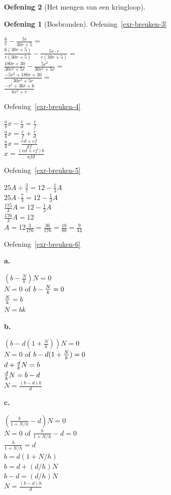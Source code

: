 \documentclass[
  a4paper,
]{scrbook}
\theoremstyle{definition}
\newtheorem{exercise}{Oefening}[chapter]
\theoremstyle{remark}
\begin{document}
\begin{exercise}[Het mengen van een
kringloop]
\begin{exercise}[Bosbranden]
Oefening~\ref{exr-breuken-3}

\(\frac{6}{r} - \frac{5r}{30r+5} =\)\\
\(\frac{6(30r + 5)}{r(30r + 5)} - \frac{5r\cdot r}{r(30r+5)} =\)\\
\(\frac{180r + 30}{30r^2 + 5r} - \frac{5r^2}{30r^2+5r} =\)\\
\(\frac{-5r^2 + 180r + 30}{30r^2 + 5r} =\)\\
\(\frac{-r^2 + 36r + 6}{6r^2 + r}\)

Oefening~\ref{exr-breuken-4}

\(\frac{a}{b}x - \frac{c}{d} = \frac{e}{f}\)\\
\(\frac{a}{b}x=\frac{e}{f}+\frac{c}{d}\)\\
\(\frac{a}{b}x=\frac{ed+cf}{df}\)\\
\(x=\frac{(ed+cf)b}{afd}\)

Oefening~\ref{exr-breuken-5}

\(25A\div\frac{3}{7} = 12 - \frac{1}{3}A\)\\
\(25 A \cdot\frac{7}{3}=12-\frac{1}{3}A\)\\
\(\frac{175}{3}A=12-\frac{1}{3}A\)\\
\(\frac{176}{3}A=12\)\\
\(A=12\frac{3}{176}=\frac{36}{176}=\frac{18}{88}=\frac{9}{44}\)

Oefening~\ref{exr-breuken-6}

\textbf{a.}

\((b-\frac{N}{k})N = 0\)\\
\(N=0\) of \(b-{N \over k}=0\)\\
\({N \over k}=b\)\\
\(N=bk\)

\textbf{b.}

\((b-d(1+\frac{N}{k}))N = 0\)\\
\(N=0\) of \(b-d(1+{N \over k})=0\)\\
\(d+{d\over k}N=b\)\\
\({d\over k}N=b-d\)\\
\(N=\frac{(b-d)k}{d}\)

\textbf{c.}

\((\frac{b}{1+N/h}-d)N = 0\)\\
\(N=0\) of \(\frac{b}{1+N/h}-d=0\)\\
\(\frac{b}{1+N/h}=d\)\\
\(b=d(1+N/h)\)\\
\(b=d+(d/h)N\)\\
\(b-d=(d/h)N\)\\
\(N=\frac{(b-d)h}{d}\)


\end{exercise}
\end{exercise}
\end{document}

